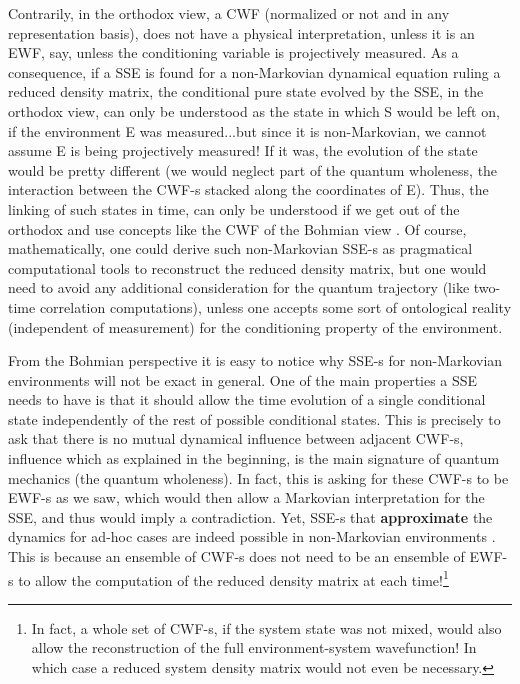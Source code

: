 \documentclass[11pt, a4paper]{article} %
\begin{document}
Contrarily, in the orthodox view, a CWF (normalized or not and in any representation basis), does not have a physical interpretation, unless it is an EWF, say, unless the conditioning variable is projectively measured. As a consequence, if a SSE is found for a non-Markovian dynamical equation ruling a reduced density matrix, the conditional pure state evolved by the SSE, in the orthodox view, can only be understood as the state in which S would be left on, if the environment E was measured...but since it is non-Markovian, we cannot assume E is being projectively measured! If it was, the evolution of the state would be pretty different (we would neglect part of the quantum wholeness, the interaction between the CWF-s stacked along the coordinates of E). Thus, the linking of such states in time, can only be understood if we get out of the orthodox and use concepts like the CWF of the Bohmian view \cite{NMisModal, interpretSSE}. Of course, mathematically, one could derive such non-Markovian SSE-s as pragmatical computational tools to reconstruct the reduced density matrix, but one would need to avoid any additional consideration for the quantum trajectory (like two-time correlation computations), unless one accepts some sort of ontological reality (independent of measurement) for the conditioning property of the environment.

From the Bohmian perspective it is easy to notice why SSE-s for non-Markovian environments will not be exact in general. One of the main properties a SSE needs to have is that it should allow the time evolution of a single conditional state independently of the rest of possible conditional states. This is precisely to ask that there is no mutual dynamical influence between adjacent CWF-s, influence which as explained in the beginning, is the main signature of quantum mechanics (the quantum wholeness). In fact, this is asking for these CWF-s to be EWF-s as we saw, which would then allow a Markovian interpretation for the SSE, and thus would imply a contradiction. Yet, SSE-s that {\bf approximate} the dynamics for ad-hoc cases are indeed possible in non-Markovian environments \cite{ Diosi, WisemanSSE, Thz}. This is because an ensemble of CWF-s does not need to be an ensemble of EWF-s to allow the computation of the reduced density matrix at each time!\footnote{In fact, a whole set of CWF-s, if the system state was not mixed, would also allow the reconstruction of the full environment-system wavefunction! In which case a reduced system density matrix would not even be necessary.} 
\end{document}
